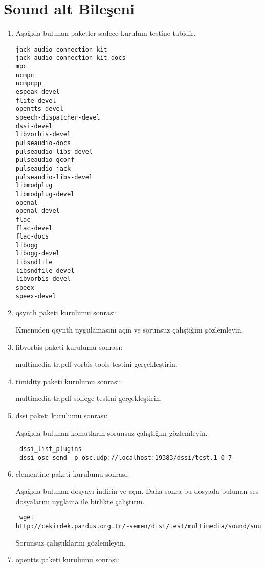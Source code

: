 \documentclass[a4paper,10pt]{article}
\begin{document}
\section{Sound alt Bileşeni}
\begin{enumerate}

\item Aşağıda bulunan paketler sadece kurulum testine tabidir.
\begin{verbatim}
jack-audio-connection-kit 
jack-audio-connection-kit-docs
mpc
ncmpc
ncmpcpp
espeak-devel
flite-devel
opentts-devel
speech-dispatcher-devel
dssi-devel
libvorbis-devel
pulseaudio-docs
pulseaudio-libs-devel
pulseaudio-gconf
pulseaudio-jack
pulseaudio-libs-devel
libmodplug
libmodplug-devel
openal
openal-devel
flac
flac-devel
flac-docs
libogg
libogg-devel
libsndfile
libsndfile-devel
libvorbis-devel
speex
speex-devel
\end{verbatim}

\item qsynth paketi kurulumu sonrası:

Kmenuden qsynth uygulamasını açın ve sorunsuz çalıştığını gözlemleyin.

\item libvorbis paketi kurulumu sonrası:

multimedia-tr.pdf vorbis-tools testini gerçekleştirin.

\item timidity paketi kurulumu sonrası:

multimedia-tr.pdf solfege testini gerçekleştirin.

\item dssi paketi kurulumu sonrası:

Aşağıda bulunan komutların sorunsuz çalıştığını gözlemleyin.
\begin{verbatim}
 dssi_list_plugins
 dssi_osc_send -p osc.udp://localhost:19383/dssi/test.1 0 7
\end{verbatim}


\item clementine paketi kurulumu sonrası:

Aşağıda bulunan dosyayı indirin ve açın. Daha sonra bu dosyada bulunan ses dosyalarını uyglama ile birlikte çalıştırın.
\begin{verbatim}
 wget http://cekirdek.pardus.org.tr/~semen/dist/test/multimedia/sound/sound.tar
\end{verbatim}

Sorunsuz çalıştıklarını gözlemleyin.

\item opentts paketi kurulumu sonrası:


\end{enumerate}
\end{document}
